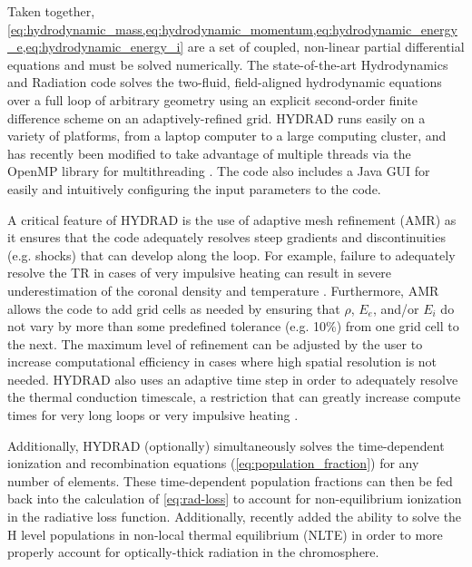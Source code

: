 Taken together, \cref{eq:hydrodynamic_mass,eq:hydrodynamic_momentum,eq:hydrodynamic_energy_e,eq:hydrodynamic_energy_i} are a set of coupled, non-linear partial differential equations and must be solved numerically. The state-of-the-art Hydrodynamics and Radiation code \citep[HYDRAD,][]{bradshaw_radiative_2003,bradshaw_self-consistent_2003,bradshaw_influence_2013} solves the two-fluid, field-aligned hydrodynamic equations over a full loop of arbitrary geometry using an explicit second-order finite difference scheme on an adaptively-refined grid. HYDRAD runs easily on a variety of platforms, from a laptop computer to a large computing cluster, and has recently been modified to take advantage of multiple threads via the OpenMP library for multithreading \citep{reep_efficient_2019}. The code also includes a Java GUI for easily and intuitively configuring the input parameters to the code. 

A critical feature of HYDRAD is the use of adaptive mesh refinement (AMR) as it ensures that the code adequately resolves steep gradients and discontinuities (e.g. shocks) that can develop along the loop. For example, failure to adequately resolve the TR in cases of very impulsive heating can result in severe underestimation of the coronal density and temperature \citep{bradshaw_influence_2013}. Furthermore, AMR allows the code to add grid cells as needed by ensuring that $\rho$, $E_e$, and/or $E_i$ do not vary by more than some predefined tolerance (e.g. 10\%) from one grid cell to the next. The maximum level of refinement can be adjusted by the user to increase computational efficiency in cases where high spatial resolution is not needed. HYDRAD also uses an adaptive time step in order to adequately resolve the thermal conduction timescale, a restriction that can greatly increase compute times for very long loops or very impulsive heating \citep[though see a possible alternative in][]{johnston_new_2017}.

Additionally, HYDRAD (optionally) simultaneously solves the time-dependent ionization and recombination equations (\autoref{eq:population_fraction}) for any number of elements. These time-dependent population fractions can then be fed back into the calculation of \autoref{eq:rad-loss} to account for non-equilibrium ionization in the radiative loss function. Additionally, \citet{reep_efficient_2019} recently added the ability to solve the H level populations in non-local thermal equilibrium (NLTE) in order to more properly account for optically-thick radiation in the chromosphere. 

